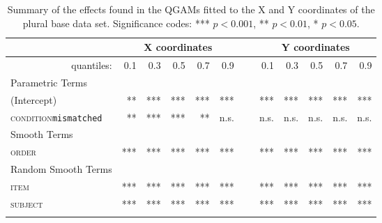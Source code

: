 \begin{table}\fontsize{9}{10}
\caption{Summary of the effects found in the QGAMs fitted to the X and Y coordinates of the plural base data set. Significance codes: *** $p < 0.001$, ** $p < 0.01$, * $p < 0.05$.}
\label{tab:7.12}
\centering
\begin{tabular}{lrrrrrrrrrrr}
\lsptoprule
~                   & \multicolumn{5}{c}{X coordinates}       & \multicolumn{1}{c}{}                        & \multicolumn{5}{c}{Y coordinates}                               \\
\midrule
\multicolumn{1}{r}{quantiles:}          & 0.1        & 0.3        & 0.5        & 0.7        & 0.9  & ~       & 0.1        & 0.3        & 0.5        & 0.7        & 0.9         \\
\midrule
Parametric Terms    & \textbf{~} & \textbf{~} & \textbf{~} & \textbf{~} & \textbf{~} & \textbf{~} & \textbf{~} & \textbf{~} & \textbf{~} & \textbf{~}  \\
\midrule
(Intercept)         & **        & ***        & ***        & ***        & *** & ~       & ***        & ***        & ***        & ***        & ***          \\
\textsc{condition}\texttt{mismatched} & **       & ***          & ***        & **        & n.s.  & ~      & n.s.       & n.s.        & n.s.        & n.s.        & n.s.         \\
\midrule
Smooth Terms        & \textbf{~} & \textbf{~} & \textbf{~} & \textbf{~} & \textbf{~} & \textbf{~} & \textbf{~} & \textbf{~} & \textbf{~} & \textbf{~}  \\
\midrule
\textsc{order}               & ***        & ***        & ***        & ***        & *** & ~       & ***        & ***        & ***        & ***        & ***         \\
\midrule
Random Smooth Terms & \textbf{~} & \textbf{~} & \textbf{~} & \textbf{~} & \textbf{~} & \textbf{~} & \textbf{~} & \textbf{~} & \textbf{~} & \textbf{~}  \\
\midrule
\textsc{item}                & ***        & ***        & ***        & ***        & ***  & ~      & ***        & ***        & ***        & ***        & ***         \\
\textsc{subject}             & ***        & ***        & ***        & ***        & ***  & ~      & ***        & ***        & ***        & ***        & ***        \\
\lspbottomrule
\end{tabular}
\end{table}

